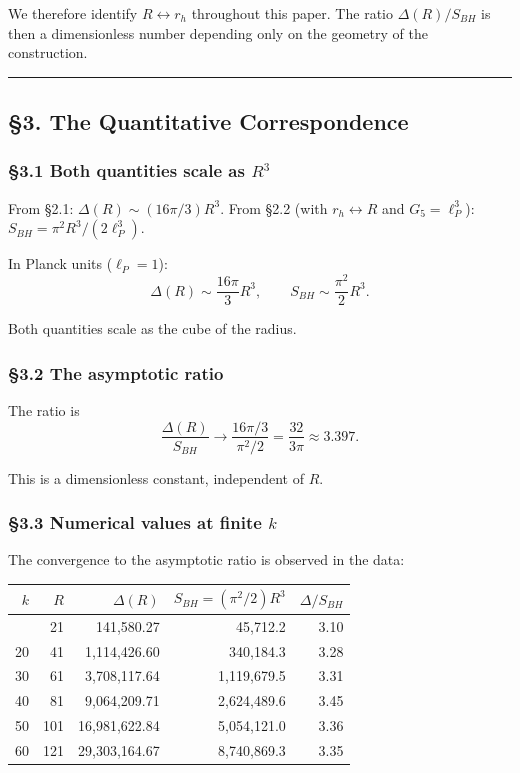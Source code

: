 \documentclass[a4paper,11pt]{article}
\theoremstyle{definition}
\begin{document}
We therefore identify \(R \leftrightarrow r_h\) throughout this paper.
The ratio \(\Delta(R)/S_{BH}\) is then a dimensionless number depending
only on the geometry of the construction.

\begin{center}\rule{0.5\linewidth}{0.5pt}\end{center}

\subsection{§3. The Quantitative
Correspondence}\label{the-quantitative-correspondence}

\subsubsection{\texorpdfstring{§3.1 Both quantities scale as
\(R^3\)}{§3.1 Both quantities scale as R\^{}3}}\label{both-quantities-scale-as-r3}

From §2.1: \(\Delta(R) \sim (16\pi/3) R^3\). From §2.2 (with
\(r_h \leftrightarrow R\) and \(G_5 = \ell_P^3\)):
\(S_{BH} = \pi^2 R^3 / (2 \ell_P^3)\).

In Planck units (\(\ell_P = 1\)):
\[\Delta(R) \sim \frac{16\pi}{3} R^3, \qquad S_{BH} \sim \frac{\pi^2}{2} R^3.\]

Both quantities scale as the cube of the radius.

\subsubsection{§3.2 The asymptotic ratio}\label{the-asymptotic-ratio}

The ratio is
\[\frac{\Delta(R)}{S_{BH}} \to \frac{16\pi/3}{\pi^2/2} = \frac{32}{3\pi} \approx 3.397.\]

This is a dimensionless constant, independent of \(R\).

\subsubsection{\texorpdfstring{§3.3 Numerical values at finite
\(k\)}{§3.3 Numerical values at finite k}}\label{numerical-values-at-finite-k}

The convergence to the asymptotic ratio is observed in the data:

{\def\LTcaptype{none} %
\begin{longtable}[]{@{}rrrrr@{}}
\toprule\noalign{}
\(k\) & \(R\) & \(\Delta(R)\) & \(S_{BH} = (\pi^2/2) R^3\) &
\(\Delta/S_{BH}\) \\
\midrule\noalign{}
\endhead
\bottomrule\noalign{}
\endlastfoot
10 & 21 & 141,580.27 & 45,712.2 & 3.10 \\
20 & 41 & 1,114,426.60 & 340,184.3 & 3.28 \\
30 & 61 & 3,708,117.64 & 1,119,679.5 & 3.31 \\
40 & 81 & 9,064,209.71 & 2,624,489.6 & 3.45 \\
50 & 101 & 16,981,622.84 & 5,054,121.0 & 3.36 \\
60 & 121 & 29,303,164.67 & 8,740,869.3 & 3.35 \\
\end{longtable}
}
\end{document}
